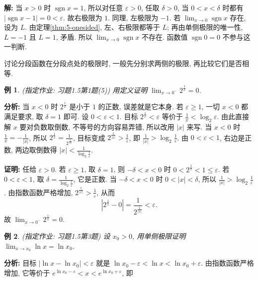 \documentclass[UTF8,openany]{ctexbook}
\theoremstyle{chinesetextbook}
\newtheorem{example}{例}[section]
\newenvironment{cnproof}{\par\indent\textbf{证明:} \ignorespaces}{\par}
\newenvironment{cnsolution}{\par\indent\textbf{解:} \ignorespaces}{\par}
\begin{document}
\begin{cnsolution}
当 $x>0$ 时 $\operatorname{sgn}x=1$, 所以对任意 $\varepsilon>0$, 任取 $\delta>0$, 当 $0<x<\delta$ 时都有 $|\operatorname{sgn}x-1|=0<\varepsilon$. 故右极限为 $1$. 同理, 左极限为 $-1$. 若 $\displaystyle\lim_{x\to0}\operatorname{sgn}x$ 存在, 设为 $L$. 由定理\ref{thm:5-onesided}, 左、右极限都等于 $L$; 再由单侧极限的唯一性, $L=-1$ 且 $L=1$, 矛盾. 所以 $\displaystyle\lim_{x\to0}\operatorname{sgn}x$ 不存在. 函数值 $\operatorname{sgn}0=0$ 不参与这一判断.
\end{cnsolution}
讨论分段函数在分段点处的极限时, 一般先分别求两侧的极限, 再比较它们是否相等.
\begin{example}\label{ex:h15-1-5}
\textnormal{(指定作业: 习题1.5第1题(5))} 用定义证明 $\displaystyle\lim_{x\to0^-}2^{\frac1x}=0$.
\end{example}
\par\indent\textbf{分析:} 当 $x<0$ 时 $2^{\frac1x}$ 是小于 $1$ 的正数, 误差就是它本身. 若 $\varepsilon\ge1$, 一切 $x<0$ 都满足要求, 取 $\delta=1$ 即可. 设 $0<\varepsilon<1$. 目标 $2^{\frac1x}<\varepsilon$ 等价于 $\displaystyle\frac1x<\log_2\varepsilon$. 由此直接解 $x$ 要对负数取倒数, 不等号的方向容易弄错, 所以改用 $|x|$ 来写. 当 $x<0$ 时 $\displaystyle\frac1x=-\frac1{|x|}$, 所以 $\displaystyle2^{\frac1x}=\frac1{2^{\frac1{|x|}}}$, 目标变成 $\displaystyle2^{\frac1{|x|}}>\frac1\varepsilon$, 即 $\displaystyle\frac1{|x|}>\log_2\frac1\varepsilon$. 由 $0<\varepsilon<1$, 右边是正数, 两边取倒数得 $\displaystyle|x|<\frac1{\log_2\frac1\varepsilon}$.
\begin{cnproof}
任给 $\varepsilon>0$. 若 $\varepsilon\ge1$, 取 $\delta=1$, 则 $-\delta<x<0$ 时 $0<2^{\frac1x}<1\le\varepsilon$. 若 $0<\varepsilon<1$, 取 $\displaystyle\delta=\frac1{\log_2\frac1\varepsilon}$, 它是正数. 当 $-\delta<x<0$ 时 $0<|x|<\delta$, 所以 $\displaystyle\frac1{|x|}>\log_2\frac1\varepsilon$. 由指数函数严格增加, $\displaystyle2^{\frac1{|x|}}>\frac1\varepsilon$, 从而
\[
\left|2^{\frac1x}-0\right|=\frac1{2^{\frac1{|x|}}}<\varepsilon.
\]
故 $\displaystyle\lim_{x\to0^-}2^{\frac1x}=0$.
\end{cnproof}
\begin{example}\label{ex:h15-3}
\textnormal{(指定作业: 习题1.5第3题)} 设 $x_0>0$, 用单侧极限证明 $\displaystyle\lim_{x\to x_0}\ln x=\ln x_0$.
\end{example}
\par\indent\textbf{分析:} 目标 $|\ln x-\ln x_0|<\varepsilon$ 就是 $\ln x_0-\varepsilon<\ln x<\ln x_0+\varepsilon$. 由指数函数严格增加, 它等价于 $e^{\ln x_0-\varepsilon}<x<e^{\ln x_0+\varepsilon}$, 即
\end{document}
